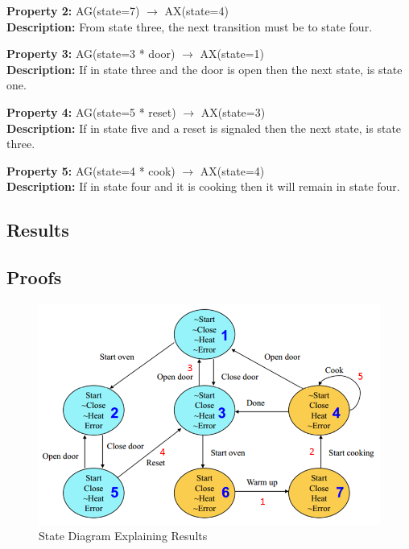 \documentclass[11pt]{article}
\begin{document}
		\textbf{Property 2:} AG(state=7) $\to$ AX(state=4)\\ 
		\textbf{Description:} From state three, the next transition must be to state four. \\
		\vspace{12pt}
		
		\textbf{Property 3:} 	AG(state=3 * door) $\to$ AX(state=1)\\ 
		\textbf{Description:} If in state three and the door is open then the next state, is state one. \\
		\vspace{12pt}
		
		\textbf{Property 4:} AG(state=5 * reset) $\to$ AX(state=3) \\
		\textbf{Description:} If in state five and a reset is signaled then the next state, is state three.\\
		\vspace{12pt}
		
		\textbf{Property 5:} AG(state=4 * cook) $\to$ AX(state=4)  \\
		\textbf{Description:} If in state four and it is cooking then it will remain in state four.\\
		
		
	
	\subsection{Results}
	\subsection{Proofs}
	
	\begin{figure}[h]\centering
	\includegraphics[height=0.45\textwidth]{images/p2_2_proof.png}
		\caption{State Diagram Explaining Results}
			\label{p2_p}
		\end{figure}
		
\end{document}
